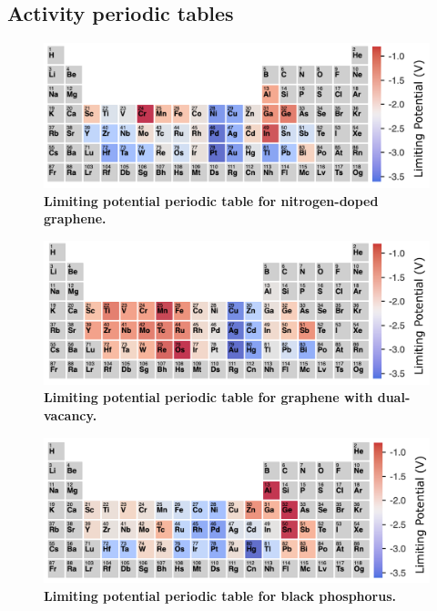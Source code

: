 \documentclass[a4paper, 12pt]{article}
\begin{document}
\subsection{Activity periodic tables}
\label{supp_sec2.7_ptable}

\begin{figure}[htbp]
  \centering
  \includegraphics[width=\textwidth]{supp_fig13_n-gra_ptable.png}
  \caption{\textbf{Limiting potential periodic table for nitrogen-doped graphene.}}
  \label{supp_fig13:n-gra_ptable}
\end{figure}

\begin{figure}[htbp]
  \centering
  \includegraphics[width=\textwidth]{supp_fig14_gra-vac_ptable.png}
  \caption{\textbf{Limiting potential periodic table for graphene with dual-vacancy.}}
  \label{supp_fig14:gra-vac_ptable}
\end{figure}

\begin{figure}[htbp]
  \centering
  \includegraphics[width=\textwidth]{supp_fig15_BP_ptable.png}
  \caption{\textbf{Limiting potential periodic table for black phosphorus.}}
  \label{supp_fig15:BP_ptable}
\end{figure}
\end{document}
